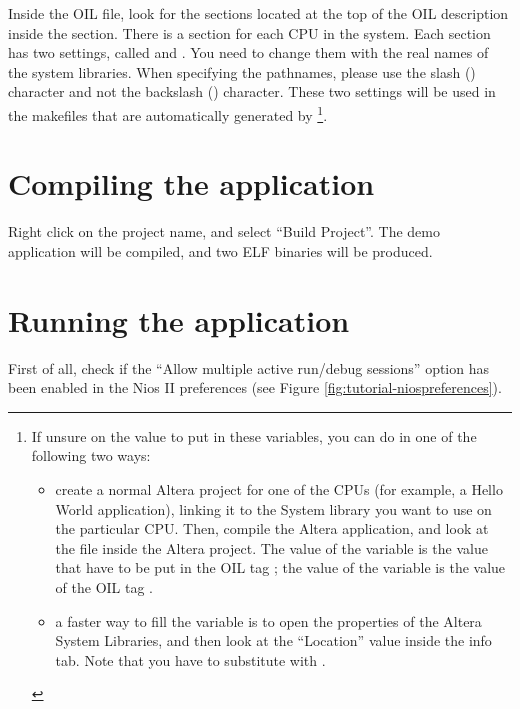 Inside the OIL file, look for the  sections located at
the top of the OIL description inside the  section. There is
a  section for each CPU in the system. Each section
has two settings, called  and
. You need to change them with the real
names of the system libraries. When specifying the pathnames, please
use the slash (\file{/}) character and not the backslash (\file{\\})
character. These two settings will be used in the makefiles that are
automatically generated by \rtd\footnote{If unsure on the value to
put in these variables, you can do in one of the following two ways:
\begin{itemize}
\item create a normal Altera project for one of the CPUs (for example,
  a Hello World application), linking it to the System library you
  want to use on the particular CPU. Then, compile the Altera
  application, and look at the file  inside the
  Altera project.  The value of the  variable is
  the value that have to be put in the OIL tag
  ; the value of the variable
   is the value of the OIL tag
  .
\item a faster way to fill the  variable is
  to open the properties of the Altera System Libraries, and then look
  at the ``Location'' value inside the info tab. Note that you have to
  substitute \file{\\} with \file{/}.
\end{itemize}
}.


\section{Compiling the application}
Right click on the project name, and select ``Build
Project''.  The demo application will be compiled, and two ELF
binaries will be produced.




\section{Running the application}

First of all, check if the ``Allow multiple active run/debug
sessions'' option has been enabled in the Nios II preferences (see
Figure \ref{fig:tutorial-niospreferences}).

